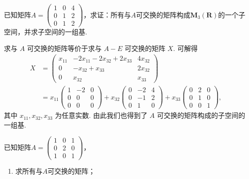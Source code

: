 \begin{exercise}
\begin{exgroup}
        \item 已知矩阵$A=\begin{pmatrix}
                1 & 0 & 4 \\ 0 & 1 & 2 \\ 0 & 1 & 2
            \end{pmatrix}$，求证：所有与$A$可交换的矩阵构成$\mathbf{M}_3(\mathbf{R})$的一个子空间，并求子空间的一组基.
        \begin{answer}
            求与 $ A $ 可交换的矩阵等价于求与 $ A - E $ 可交换的矩阵 $ X $. 可解得
            \begin{align*}
                X & = \begin{pmatrix}
                            x_{11} & -2x_{11} - 2x_{32} + 2x_{33} & 4x_{32} \\
                            0      & -x_{32} + x_{33}             & 2x_{32} \\
                            0      & x_{32}                       & x_{33}
                        \end{pmatrix} \\
                    & = x_{11} \begin{pmatrix}
                                1 & -2 & 0 \\
                                0 & 0  & 0 \\
                                0 & 0  & 0
                            \end{pmatrix}
                + x_{32} \begin{pmatrix}
                            0 & -2 & 4 \\
                            0 & -1 & 2 \\
                            0 & 1  & 0
                        \end{pmatrix}
                + x_{33} \begin{pmatrix}
                            0 & 2 & 0 \\
                            0 & 1 & 0 \\
                            0 & 0 & 1
                        \end{pmatrix},
            \end{align*}
            其中 $ x_{11}, x_{32}, x_{33} $ 为任意实数. 由此我们也得到了 $ A $ 可交换的矩阵构成的子空间的一组基.
        \end{answer}

        \item 已知矩阵$A=\begin{pmatrix}
                1 & 0 & 1 \\ 0 & 2 & 0 \\ 1 & 0 & 1
            \end{pmatrix}$，
        \begin{enumerate}
            \item 求所有与$A$可交换的矩阵；


\end{enumerate}
\end{exgroup}
\end{exercise}
